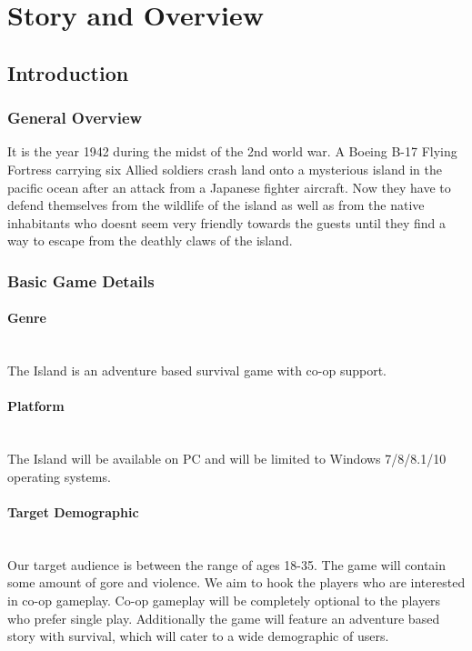 \section{\Large Story and Overview}
    \subsection{\Large Introduction}
        \subsubsection{\Large General Overview}
            It is the year 1942 during the midst of the 2nd world war. 
            A Boeing B-17 Flying Fortress carrying six Allied soldiers crash 
            land onto a mysterious island in the pacific ocean after an attack 
            from a Japanese fighter aircraft. Now they have to defend themselves 
            from the wildlife of the island as well as from the native inhabitants 
            who doesn\textquotesingle t seem very friendly towards the guests until they find a 
            way to escape from the deathly claws of the island.
        \subsubsection{\Large Basic Game Details}
            \paragraph{\Large Genre}\mbox{}\\
                The Island is an adventure based survival game with co-op support. 
            \paragraph{\Large Platform}\mbox{}\\
                The Island will be available on PC and will be limited to Windows 7/8/8.1/10 operating systems. 
            \paragraph{\Large Target Demographic}\mbox{}\\
                Our target audience is between the range of ages 18-35. The game 
                will contain some amount of gore and violence. We aim to hook the 
                players who are interested in co-op gameplay. Co-op gameplay will 
                be completely optional to the players who prefer single play. 
                Additionally the game will feature an adventure based story with 
                survival, which will cater to a wide demographic of users. 
